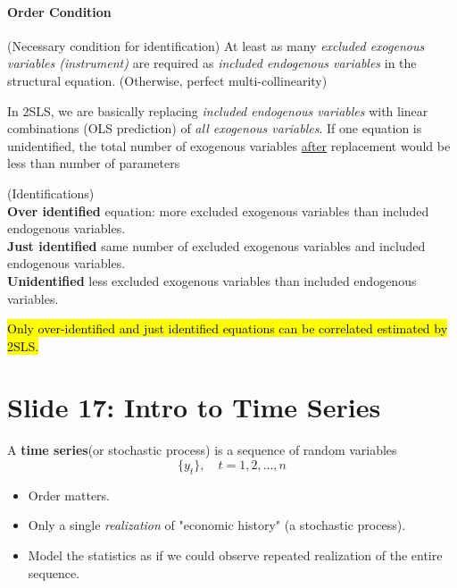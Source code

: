 \documentclass[]{article}
\begin{document}
			\paragraph{Order Condition}(Necessary condition for identification) At least as many \emph{excluded exogenous variables (instrument)} are required as \emph{included endogenous variables} in the structural equation. (Otherwise, perfect multi-collinearity)
			
			\begin{remark}
				In 2SLS, we are basically replacing \emph{included endogenous variables} with linear combinations (OLS prediction) of \emph{all exogenous variables}. If one equation is unidentified, the total number of exogenous variables \ul{after} replacement would be less than number of parameters
			\end{remark}
			\begin{definition} (Identifications) \\
				\textbf{Over identified} equation: more excluded exogenous variables than included endogenous variables. \\
				\textbf{Just identified} same number of excluded exogenous variables and included endogenous variables. \\
				\textbf{Unidentified} less excluded exogenous variables than included endogenous variables.
			\end{definition}
			\begin{remark}
				\hl{Only over-identified and just identified equations can be correlated estimated by 2SLS.}
			\end{remark}
			
	\setcounter{section}{16}
	\section{Slide 17: Intro to Time Series}
		\begin{definition}
			A \textbf{time series}(or stochastic process) is a sequence of random variables
			\[
				\{y_t\},\quad t = 1,2,\dots,n
			\]
		\end{definition}
		\begin{itemize}
			\item Order matters.
			\item Only a single \emph{realization} of "economic history" (a stochastic process).
			\item Model the statistics as if we could observe repeated realization of the entire sequence.
		\end{itemize}
		
\end{document}
